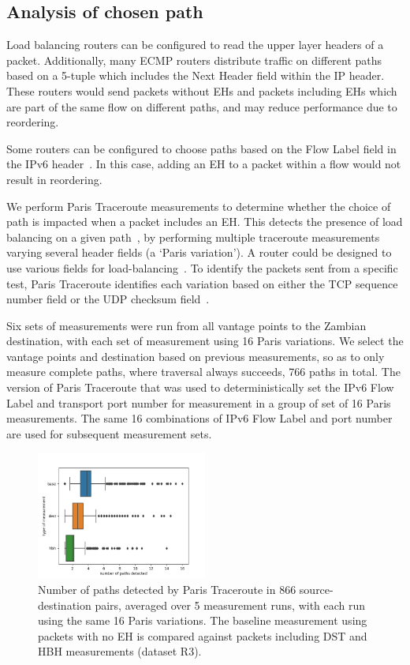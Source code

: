 \documentclass[conference]{IEEEtran}
\begin{document}
\subsection{Analysis of chosen path}

Load balancing routers can be configured to read the upper layer headers of a packet. Additionally, many ECMP routers distribute traffic on different paths based on a 5-tuple which includes the Next Header field within the IP header. These routers would send packets without EHs and packets including EHs which are part of the same flow on different paths, and may reduce performance due to reordering.

Some routers can be configured to choose paths based on the Flow Label field in the IPv6 header~\cite{lb-classification}. In this case, adding an EH to a packet within a flow would not result in reordering.

We perform Paris Traceroute measurements to determine whether the choice of path is impacted when a packet includes an EH. This detects the presence of load balancing on a given path~\cite{augustin2006avoiding}, by performing multiple traceroute measurements varying several header fields (a `Paris variation'). A router could be designed to use various fields for load-balancing~\cite{lb-classification}. To identify the packets sent from a specific test, Paris Traceroute identifies each variation based on either the TCP sequence number field or the UDP checksum field~\cite{augustin2006avoiding}.

Six sets of measurements were run from all vantage points to the Zambian destination, with each set of measurement using 16 Paris variations. We select the vantage points and destination based on previous measurements, so as to only measure complete paths, where traversal always succeeds, 766 paths in total. The version of Paris Traceroute that was used to deterministically set the IPv6 Flow Label and transport port number for measurement in a group of set of 16 Paris measurements. The same 16 combinations of IPv6 Flow Label and port number are used for subsequent measurement sets.

\begin{figure}
\centering
  \includegraphics[width=0.5\textwidth]{boxplot-paths-detected.png}
  \caption{Number of paths detected by Paris Traceroute in 866 source-destination pairs, averaged over 5 measurement runs, with each run using the same 16 Paris variations. The baseline measurement using packets with no EH is compared against packets including DST and HBH measurements (dataset R3).}
  \label{fig:paths-detected}
\end{figure}
\end{document}
